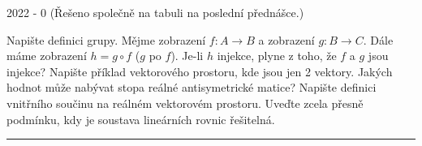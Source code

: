 
\newpage
{\large 2022 - 0} (Řešeno společně na tabuli na poslední přednášce.)

\begin{questions}

\question Napište definici grupy.
\question Mějme zobrazení \(f: A \rightarrow B\) a zobrazení \(g: B \rightarrow C\). Dále máme zobrazení \(h = g \circ f\) (\(g\) po \(f\)). Je-li \(h\) injekce, plyne z toho, že \(f\) a \(g\) jsou injekce?
\question Napište příklad vektorového prostoru, kde jsou jen 2 vektory.
\question Jakých hodnot může nabývat stopa reálné antisymetrické matice?
\question Napište definici vnitřního součinu na reálném vektorovém prostoru.
\question Uveďte zcela přesně podmínku, kdy je soustava lineárních rovnic řešitelná.

\end{questions}

\hrule

